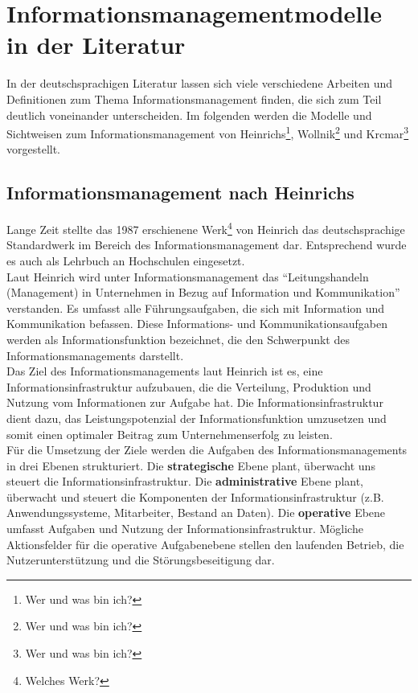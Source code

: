 \section{Informationsmanagementmodelle in der Literatur}
In der deutschsprachigen Literatur lassen sich viele verschiedene Arbeiten und Definitionen zum Thema Informationsmanagement finden, die sich zum Teil deutlich voneinander unterscheiden. Im folgenden werden die Modelle und Sichtweisen zum Informationsmanagement von Heinrichs\footnote{Wer und was bin ich?}, Wollnik\footnote{Wer und was bin ich?} und Krcmar\footnote{Wer und was bin ich?} vorgestellt.

\subsection{Informationsmanagement nach Heinrichs}
Lange Zeit stellte das 1987 erschienene Werk\footnote{Welches Werk?} von Heinrich das deutschsprachige Standardwerk im Bereich des Informationsmanagement dar. Entsprechend wurde es auch als Lehrbuch an Hochschulen eingesetzt.\\

Laut Heinrich wird unter Informationsmanagement das “Leitungshandeln (Management) in Unternehmen in Bezug auf Information und Kommunikation” verstanden. Es umfasst alle Führungsaufgaben, die sich mit Information und Kommunikation befassen. Diese Informations- und Kommunikationsaufgaben werden als Informationsfunktion bezeichnet, die den Schwerpunkt des Informationsmanagements darstellt.\\

Das Ziel des Informationsmanagements laut Heinrich ist es, eine Informationsinfrastruktur aufzubauen, die die Verteilung, Produktion und Nutzung vom Informationen zur Aufgabe hat. Die Informationsinfrastruktur dient dazu, das Leistungspotenzial der Informationsfunktion umzusetzen und somit einen optimaler Beitrag zum Unternehmenserfolg zu leisten.\\

Für die Umsetzung der Ziele werden die Aufgaben des Informationsmanagements in drei Ebenen strukturiert.
Die \textbf{strategische} Ebene plant, überwacht uns steuert die Informationsinfrastruktur.
Die \textbf{administrative} Ebene plant, überwacht und steuert die Komponenten der Informationsinfrastruktur (z.B. Anwendungssysteme, Mitarbeiter, Bestand an Daten).
Die \textbf{operative} Ebene umfasst Aufgaben und Nutzung der Informationsinfrastruktur. Mögliche Aktionsfelder für die operative Aufgabenebene stellen den laufenden Betrieb, die Nutzerunterstützung und die Störungsbeseitigung dar.\\

